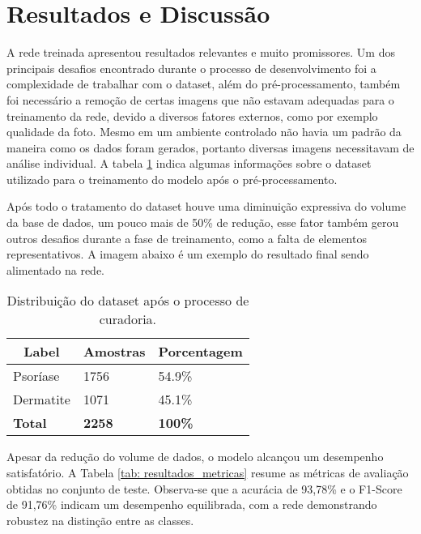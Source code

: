 \section{Resultados e Discussão}

A rede treinada apresentou resultados relevantes e muito promissores. Um dos principais desafios encontrado durante o processo de desenvolvimento foi a complexidade de trabalhar com o dataset, além do pré-processamento, também foi necessário a remoção de certas imagens que não estavam adequadas para o treinamento da rede, devido a diversos fatores externos, como por exemplo qualidade da foto. Mesmo em um ambiente controlado não havia um padrão da maneira como os dados foram gerados, portanto diversas imagens necessitavam de análise individual. A tabela \ref{tab:db-table} indica algumas informações sobre o dataset utilizado para o treinamento do modelo após o pré-processamento. 


Após todo o tratamento do dataset houve uma diminuição expressiva do volume da base de dados, um pouco mais de 50\% de redução, esse fator também gerou outros desafios durante a fase de treinamento, como a falta de elementos representativos. A imagem abaixo é um exemplo do resultado final sendo alimentado na rede.

\begin{table}[h]
  \centering
  \begin{tabular}{|l|l|l|}
  \hline
  \multicolumn{1}{|c|}{\textbf{Label}} & \multicolumn{1}{c|}{\textbf{Amostras}} & \multicolumn{1}{c|}{\textbf{Porcentagem}} \\ \hline
  Psoríase                             & 1756                                   & 54.9\%                                  \\ \hline
  Dermatite                            & 1071                                   & 45.1\%                                  \\ \hline
  \multicolumn{1}{|l|}{\textbf{Total}} & \multicolumn{1}{l|}{\textbf{2258}}     & \multicolumn{1}{l|}{\textbf{100\%}}     \\ \hline
  \end{tabular}
  \caption{Distribuição do dataset após o processo de curadoria.}
  \label{tab:db-table}
\end{table}

Apesar da redução do volume de dados, o modelo alcançou um desempenho satisfatório. A Tabela \ref{tab: resultados_metricas} resume as métricas de avaliação obtidas no conjunto de teste. Observa-se que a acurácia de 93,78\% e o F1-Score de 91,76\% indicam um desempenho equilibrada, com a rede demonstrando robustez na distinção entre as classes.

